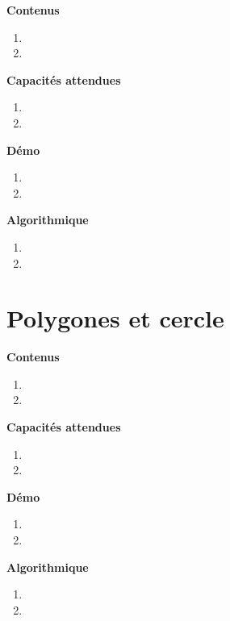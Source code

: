 \documentclass[10pt,a4paper]{article}
\begin{document}
\textbf{Contenus}

\begin{enumerate} 
\item 
\item 
\end{enumerate}


\textbf{Capacités attendues}

\begin{enumerate}
\item 
\item 
\end{enumerate}

\textbf{Démo}

\begin{enumerate}
\item 
\item 
\end{enumerate}

\textbf{Algorithmique}

\begin{enumerate}
\item 
\item 
\end{enumerate}

\section{Polygones et cercle}

\textbf{Contenus}

\begin{enumerate} 
\item 
\item 
\end{enumerate}


\textbf{Capacités attendues}

\begin{enumerate}
\item 
\item 
\end{enumerate}

\textbf{Démo}

\begin{enumerate}
\item 
\item 
\end{enumerate}

\textbf{Algorithmique}

\begin{enumerate}
\item 
\item 
\end{enumerate}
\end{document}
